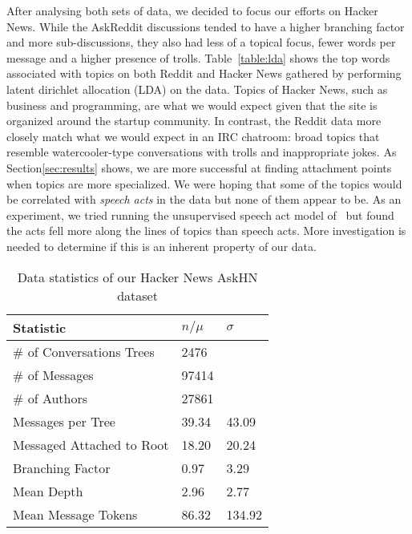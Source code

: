 \documentclass[10pt]{article}
\begin{document}
After analysing both sets of data, we decided to focus our efforts on Hacker News.
While the AskReddit discussions tended to have a higher branching factor 
and more sub-discussions, they also had less of a topical focus, fewer words per message
and a higher presence of trolls. Table~\ref{table:lda} shows the top words associated
with topics on both Reddit and Hacker News gathered by performing latent dirichlet allocation (LDA)
on the data. Topics of Hacker News, such as business and programming, are 
what we would expect given that the site is organized around the startup community.
In contrast, the Reddit data more closely match what we would expect in an IRC
chatroom: broad topics that resemble watercooler-type conversations with trolls
and inappropriate jokes. As Section\ref{sec:results} shows, we are more successful
at finding attachment points when topics are more specialized. We were hoping that
some of the topics would be correlated with \textit{speech acts} in the data but 
none of them appear to be. As an experiment, we tried running the unsupervised speech act 
model of~\cite{Paula} but found the acts fell more along the lines of 
topics than speech acts. More investigation is needed to determine if this
is an inherent property of our data.


\begin{table}[h]\footnotesize
 \begin{tabular}{| l | l | l |} 
   \hline
   \textbf{Statistic} & \textbf{$n / \mu$} & \textbf{$\sigma$} \\
   \hline
   \# of Conversations Trees & 2476 & \\
   \# of Messages & 97414 & \\
   \# of Authors & 27861 & \\
   Messages per Tree & 39.34 & 43.09 \\
   Messaged Attached to Root &  18.20 & 20.24 \\
   Branching Factor & 0.97 & 3.29 \\
   Mean Depth & 2.96 & 2.77 \\
   Mean Message Tokens & 86.32 & 134.92 \\
   \hline
  \end{tabular}
  \caption{Data statistics of our Hacker News AskHN dataset}
  \label{table:stats}
\end{table}
\end{document}
